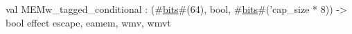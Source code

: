 val MEMw_tagged_conditional : (#\hyperref[zbits]{bits}#(64), bool, #\hyperref[zbits]{bits}#('cap_size * 8)) -> bool effect { escape, eamem, wmv, wmvt }
